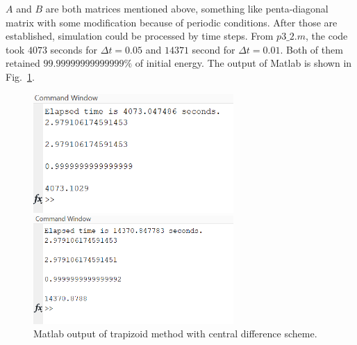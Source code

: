 \documentclass[letterpaper,10pt]{article}
\begin{document}
$A$ and $B$ are both matrices mentioned above, something like penta-diagonal matrix with some modification because of periodic conditions. 
After those are established, simulation could be processed by time steps. From $p3\_2.m$, the code took $4073$ seconds for $\Delta t=0.05$ and $14371$ second for $\Delta t = 0.01$. 
Both of them  retained $99.99999999999999\%$ of initial energy. The output of Matlab is shown in Fig.~\ref{fig3_1}. 
\begin{figure}[h]
  \centering
    \begin{minipage}[t]{0.6\linewidth}
    \centering
    \includegraphics[width=3in]{p3_1.png}
    \end{minipage}
    \begin{minipage}[t]{0.6\linewidth}
    \centering
    \includegraphics[width=3in]{p3_2.png}
    \end{minipage}
  \caption{Matlab output of trapizoid method with central difference scheme. }
  \label{fig3_1}
\end{figure}
\end{document}
